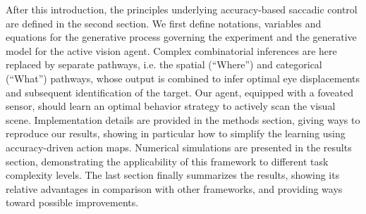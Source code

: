 After this introduction, the principles underlying accuracy-based saccadic control are defined in the second section. We first define notations, variables and equations for the generative process governing the experiment and the generative model for the active vision agent.
Complex combinatorial inferences are here replaced by separate pathways, i.e. the spatial (``Where'') and categorical (``What'') pathways, whose output is combined to infer optimal eye displacements and subsequent identification of the target. Our agent, equipped with a foveated sensor, should learn an optimal behavior strategy to actively scan the visual scene. Implementation details are provided in the methods section, giving ways to reproduce our results,  showing in particular how to simplify the learning using accuracy-driven action maps. Numerical simulations are presented in the results section, demonstrating the applicability of this framework to different task complexity levels. %
The last section finally summarizes the results, showing its relative advantages in comparison with other frameworks, and providing ways toward possible improvements.



